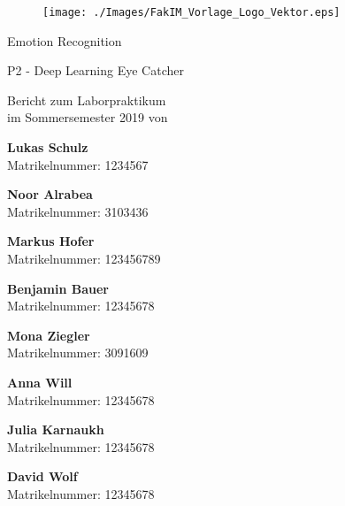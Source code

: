 \documentclass[12pt,a4paper,headinclude,twoside, plainheadsepline, open=right,numbers=noenddot]{scrreprt}
\begin{document}
\pagestyle{empty}

\clearscrheadings\clearscrplain

\begin{titlepage}
\begin{figure}[thb]
       \texttt{[image: ./Images/FakIM\_Vorlage\_Logo\_Vektor.eps]}
\end{figure}
\begin{center}
\rule{0pt}{0pt}
\vfill

\begin{huge}
Emotion Recognition\\[0.75ex]
\end{huge}
\begin{large}
P2 - Deep Learning Eye Catcher
\end{large}


\vfill
\vfill

Bericht zum Laborpraktikum\\
im Sommersemester 2019 von\\
\vfill
\setlength{\columnsep}{.0cm}
\begin{multicols}{1}

\textbf{Lukas Schulz}\\
Matrikelnummer: 1234567

\textbf{Noor Alrabea}\\
Matrikelnummer: 3103436
\end{multicols}

\begin{multicols}{2}
\textbf{Markus Hofer}\\
Matrikelnummer: 123456789

\textbf{Benjamin Bauer}\\
Matrikelnummer: 12345678
\end{multicols}

\begin{multicols}{2}
\textbf{Mona Ziegler}\\
Matrikelnummer: 3091609

\textbf{Anna Will}\\
Matrikelnummer: 12345678
\end{multicols}

\begin{multicols}{2}
\textbf{Julia Karnaukh}\\
Matrikelnummer: 12345678

\textbf{David Wolf}\\
Matrikelnummer: 12345678
\end{multicols}


\end{center}
\end{titlepage}
\end{document}
